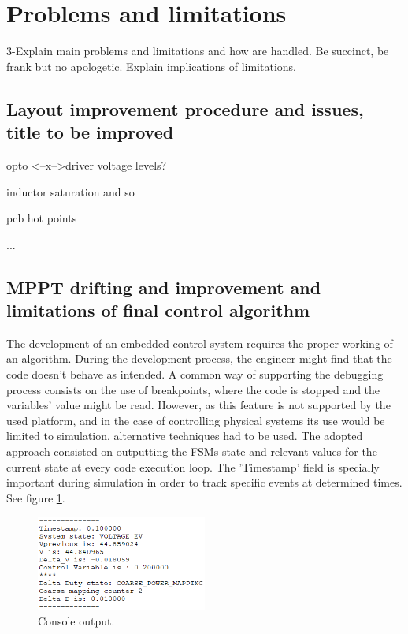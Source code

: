 \section{Problems and limitations}
3-Explain main problems and limitations and how are handled. Be succinct, be frank but no apologetic. Explain implications of limitations.
\subsection{Layout improvement procedure and issues, title to be improved}
opto <--x-->driver voltage levels?

inductor saturation and so

pcb hot points

...


\subsection{MPPT drifting and improvement and limitations of final control algorithm}
The development of an embedded control system requires the proper working of an algorithm. During the development process, the engineer might find that the code doesn't behave as intended. A common way of supporting the debugging process consists on the use of breakpoints, where the code is stopped and the variables' value might be read. However, as this feature is not supported by the used platform, and in the case of controlling physical systems its use would be limited to simulation, alternative techniques had to be used. The adopted approach consisted on outputting the FSMs state and relevant values for the current state at every code execution loop. The 'Timestamp' field is specially important during simulation in order to track specific events at determined times. See figure \ref{console_output}.

\begin{figure}[htbp]
	\begin{center}
		\includegraphics[width=0.5\textwidth]{../Pictures/P1/Discussion/console_output.png}
		\caption{Console output.}
		\label{console_output}
	\end{center}	
\end{figure}

